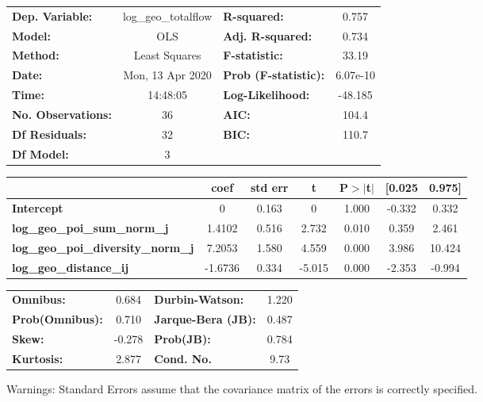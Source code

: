\begin{center}
\begin{tabular}{lclc}
\toprule
\textbf{Dep. Variable:}                    & log\_geo\_totalflow & \textbf{  R-squared:         } &     0.757   \\
\textbf{Model:}                            &         OLS         & \textbf{  Adj. R-squared:    } &     0.734   \\
\textbf{Method:}                           &    Least Squares    & \textbf{  F-statistic:       } &     33.19   \\
\textbf{Date:}                             &   Mon, 13 Apr 2020  & \textbf{  Prob (F-statistic):} &  6.07e-10   \\
\textbf{Time:}                             &       14:48:05      & \textbf{  Log-Likelihood:    } &   -48.185   \\
\textbf{No. Observations:}                 &            36       & \textbf{  AIC:               } &     104.4   \\
\textbf{Df Residuals:}                     &            32       & \textbf{  BIC:               } &     110.7   \\
\textbf{Df Model:}                         &             3       & \textbf{                     } &             \\
\bottomrule
\end{tabular}
\begin{tabular}{lcccccc}
                                           & \textbf{coef} & \textbf{std err} & \textbf{t} & \textbf{P$> |$t$|$} & \textbf{[0.025} & \textbf{0.975]}  \\
\midrule
\textbf{Intercept}                         &            0  &        0.163     &         0  &         1.000        &       -0.332    &        0.332     \\
\textbf{log\_geo\_poi\_sum\_norm\_j}       &       1.4102  &        0.516     &     2.732  &         0.010        &        0.359    &        2.461     \\
\textbf{log\_geo\_poi\_diversity\_norm\_j} &       7.2053  &        1.580     &     4.559  &         0.000        &        3.986    &       10.424     \\
\textbf{log\_geo\_distance\_ij}            &      -1.6736  &        0.334     &    -5.015  &         0.000        &       -2.353    &       -0.994     \\
\bottomrule
\end{tabular}
\begin{tabular}{lclc}
\textbf{Omnibus:}       &  0.684 & \textbf{  Durbin-Watson:     } &    1.220  \\
\textbf{Prob(Omnibus):} &  0.710 & \textbf{  Jarque-Bera (JB):  } &    0.487  \\
\textbf{Skew:}          & -0.278 & \textbf{  Prob(JB):          } &    0.784  \\
\textbf{Kurtosis:}      &  2.877 & \textbf{  Cond. No.          } &     9.73  \\
\bottomrule
\end{tabular}
\end{center}

Warnings: \newline
 [1] Standard Errors assume that the covariance matrix of the errors is correctly specified.